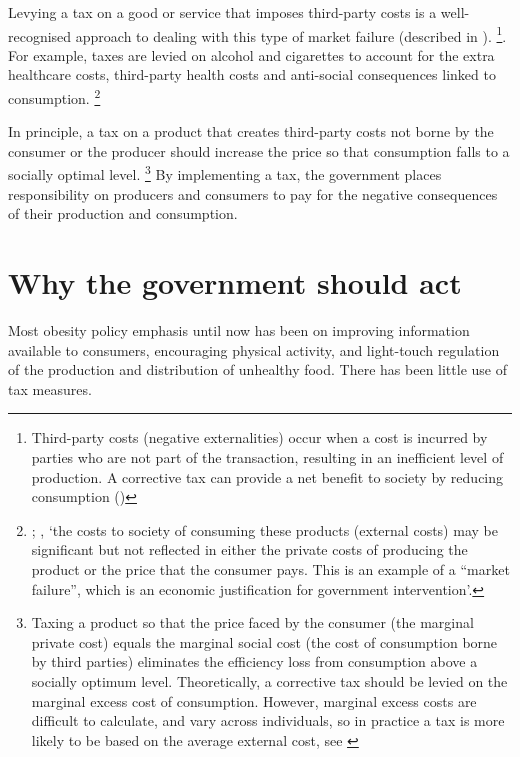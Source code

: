 \documentclass[embargoed]{grattan}
\begin{document}
Levying a tax on a good or service that imposes third-party costs is a well-recognised approach to dealing with this type of market failure (described in ).%
\footnote{Third-party costs (negative externalities) occur when a cost is incurred by parties who are not part of the transaction, resulting in an inefficient level of production.
A corrective tax can provide a net benefit to society by reducing consumption (\textcites{Freebairn2010Taxationobesity}{Greenwald1986Externalitieseconomiesimperfect})}. For example, taxes are levied on alcohol and cigarettes to account for the extra healthcare costs, third-party health costs and anti-social consequences linked to consumption.%
\footnote{\textcite{Bahl2003uneasycasediscriminatory}; \textcite{Organisation2015Usingpricepolicies}, `the costs to society of consuming these products (external costs) may be significant but not reflected in either the private costs of producing the product or the price that the consumer pays.
This is an example of a ``market failure'', which is an economic justification for government intervention'.}

In principle, a tax on a product that creates third-party costs not borne by the consumer or the producer should increase the price so that consumption falls to a socially optimal level.%
\footnote{Taxing a product so that the price faced by the consumer (the marginal private cost) equals the marginal social cost (the cost of consumption borne by third parties) eliminates the efficiency loss from consumption above a socially optimum level.
Theoretically, a corrective tax should be levied on the marginal excess cost of consumption.
However, marginal excess costs are difficult to calculate, and vary across individuals, so in practice a tax is more likely to be based on the average external cost, see \textcite{CnossenExcisetaxationAustralia}} By implementing a tax, the government places responsibility on producers and consumers to pay for the negative consequences of their production and consumption.

\section{Why the government should act}\label{why-the-government-should-act}

Most obesity policy emphasis until now has been on improving information available to consumers, encouraging physical activity, and light-touch regulation of the production and distribution of unhealthy food.
There has been little use of tax measures.
\end{document}
